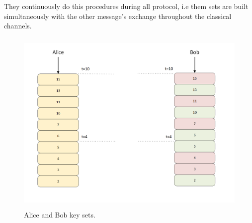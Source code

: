 \begin{enumerate}
      They continuously do this procedures during all protocol, i.e them sets are built simultaneously with the other message's exchange throughout the classical channels.

      \begin{figure}[h]
    	\centering
    	\includegraphics[width=1.0\textwidth, height=9cm]{./sdf/ot_with_discrete_variables/figures/alicebobkeys.png}
        	\caption{Alice and Bob key sets.}\label{alicebobkeys}
        \end{figure}
\end{enumerate}

